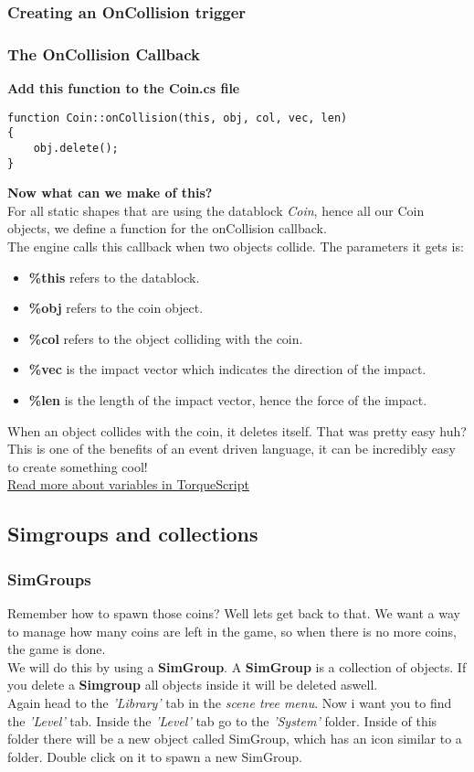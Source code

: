 \subsubsection*{Creating an OnCollision trigger}
\begin{frame}[fragile]
\frametitle{The OnCollision Callback}
{\bf Add this function to the Coin.cs file}
\TS
\begin{lstlisting}
function Coin::onCollision(this, obj, col, vec, len)
{
    obj.delete();
}
\end{lstlisting}
{\bf Now what can we make of this?}\\
For all static shapes that are using the datablock {\it Coin}, hence all our Coin objects, we define a function for the onCollision callback.\\
The engine calls this callback when two objects collide. The parameters it gets is:
\begin{itemize}
\item {\bf \%this} refers to the datablock.
\item {\bf \%obj} refers to the coin object.
\item {\bf \%col} refers to the object colliding with the coin.
\item {\bf \%vec} is the impact vector which indicates the direction of the impact.
\item {\bf \%len} is the length of the impact vector, hence the force of the impact.
\end{itemize}
When an object collides with the coin, it deletes itself. That was pretty easy huh?\\
This is one of the benefits of an event driven language, it can be incredibly easy to create something cool!\\
{\color{blue}\hyperlink{QG-Variables}{Read more about variables in TorqueScript}}
\end{frame}

\subsection*{Simgroups and collections}
\begin{frame}
\frametitle{SimGroups}
Remember how to spawn those coins? Well lets get back to that. We want a way to manage
how many coins are left in the game, so when there is no more coins, the game is done.\\
We will do this by using a {\bf SimGroup}. A {\bf SimGroup} is a collection of objects.
If you delete a {\bf Simgroup} all objects inside it will be deleted aswell.\\
Again head to the {\it 'Library'} tab in the {\it scene tree menu}. Now i want you to find the
{\it 'Level'} tab. Inside the {\it 'Level'} tab go to the {\it 'System'} folder. Inside of this folder
there will be a new object called SimGroup, which has an icon similar to a folder. Double click on it
to spawn a new SimGroup.\\
\end{frame}

